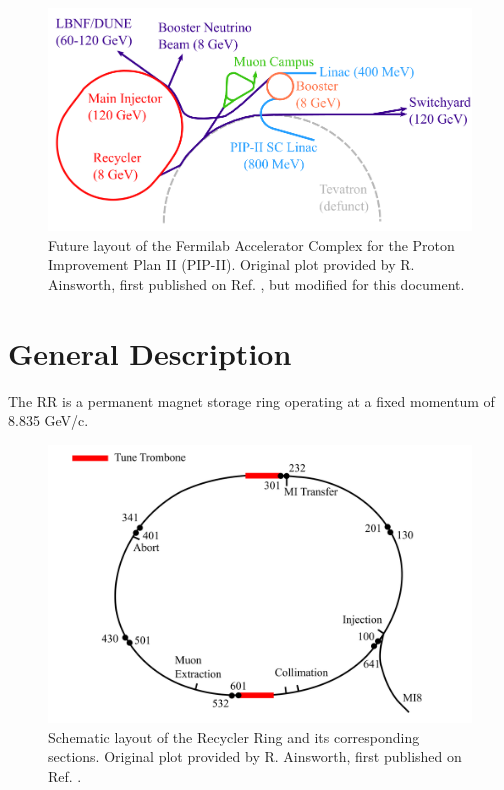\begin{figure}[H]
   \centering
   \includegraphics[width=\columnwidth]{chapter3/complexPIPII.png}
   \caption{Future layout of the Fermilab Accelerator Complex for the Proton Improvement Plan II (PIP-II). Original plot provided by R. Ainsworth, first published on Ref. \cite{rr1}, but modified for this document.}
   \label{fig:fnalpip2}
\end{figure}

\section{General Description}

The RR is a permanent magnet storage ring operating at a fixed momentum of 8.835 GeV/c. 
\cite{pipII1} \cite{rr2} \cite{fermi_rookie}

\begin{figure}[H]
   \centering
   \includegraphics[width=\columnwidth]{chapter3/RRschematic.png}
   \caption{Schematic layout of the Recycler Ring and its corresponding sections. Original plot provided by R. Ainsworth, first published on Ref. \cite{rr1}.}
   \label{fig:rrschematic}
\end{figure}


